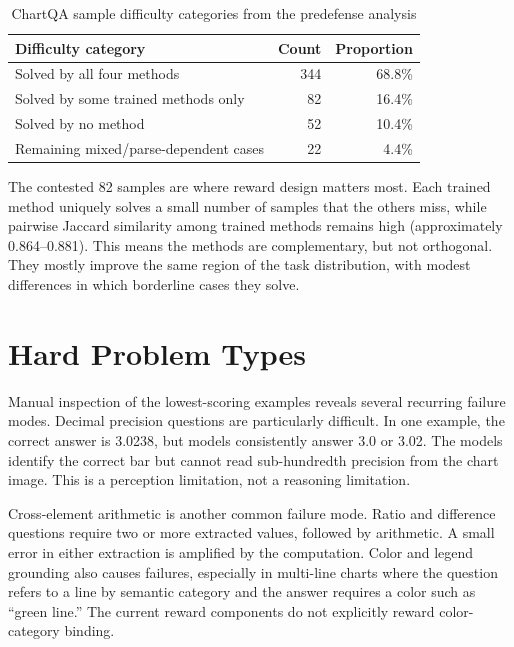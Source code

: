 \documentclass{iutbscthesis}
\begin{document}
\begin{table}[H]
    \centering
    \begin{tabular}{lrr}
        \toprule
        Difficulty category & Count & Proportion \\
        \midrule
        Solved by all four methods & 344 & 68.8\% \\
        Solved by some trained methods only & 82 & 16.4\% \\
        Solved by no method & 52 & 10.4\% \\
        Remaining mixed/parse-dependent cases & 22 & 4.4\% \\
        \bottomrule
    \end{tabular}
    \caption{ChartQA sample difficulty categories from the predefense analysis}
    \label{tab:difficulty_categories}
\end{table}

The contested 82 samples are where reward design matters most. Each trained method uniquely solves a small number of samples that the others miss, while pairwise Jaccard similarity among trained methods remains high (approximately 0.864--0.881). This means the methods are complementary, but not orthogonal. They mostly improve the same region of the task distribution, with modest differences in which borderline cases they solve.

\section{Hard Problem Types}

Manual inspection of the lowest-scoring examples reveals several recurring failure modes. Decimal precision questions are particularly difficult. In one example, the correct answer is 3.0238, but models consistently answer 3.0 or 3.02. The models identify the correct bar but cannot read sub-hundredth precision from the chart image. This is a perception limitation, not a reasoning limitation.

Cross-element arithmetic is another common failure mode. Ratio and difference questions require two or more extracted values, followed by arithmetic. A small error in either extraction is amplified by the computation. Color and legend grounding also causes failures, especially in multi-line charts where the question refers to a line by semantic category and the answer requires a color such as ``green line.'' The current reward components do not explicitly reward color-category binding.
\end{document}
